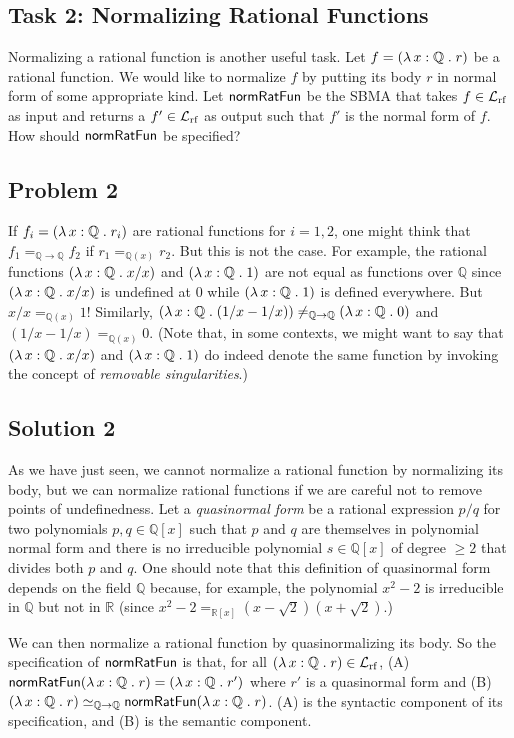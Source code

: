 \documentclass[fleqn]{llncs}
\newcommand{\QQ}{\ensuremath{\mathbb{Q}}}
\newcommand{\RR}{\ensuremath{\mathbb{R}}}
\newcommand{\NRF}{\ensuremath{\mname{normRatFun}}}
\newcommand{\funQ}[1]{\ensuremath{\LambdaApp x : \QQ \mdot #1}}
\newcommand{\Langrf}{\ensuremath{\mathcal{L}}_{\rm rf}}
\begin{document}
\subsection{Task 2: Normalizing Rational Functions}

Normalizing a rational function is another useful task.  Let $f =
(\funQ{r})$ be a rational function.  We would like to normalize $f$ by
putting its body $r$ in normal form of some appropriate kind.  Let
$\NRF$ be the SBMA that takes $f \in \Langrf$ as input and returns a
$f' \in \Langrf$ as output such that $f'$ is the normal form of $f$.
How should $\NRF$ be specified?

\subsection{Problem 2}

If $f_i = (\funQ{r_i})$ are rational functions for $i=1,2$, one might
think that $f_1 =_{\QQ \rightarrow \QQ} f_2$ if $r_1 =_{\QQ(x)} r_2$.
But this is not the case.  For example, the rational functions
$(\funQ{x/x})$ and $(\funQ{1})$ are not equal as functions over $\QQ$
since $(\funQ{x/x})$ is undefined at 0 while $(\funQ{1})$ is defined
everywhere.  But $x/x =_{\QQ(x)} 1$! Similarly, $(\funQ{(1/x - 1/x)})
\not=_{\QQ \rightarrow \QQ} (\funQ{0})$ and $(1/x - 1/x) =_{\QQ(x)}
0$.  (Note that, in some contexts, we might want to say that
$(\funQ{x/x})$ and $(\funQ{1})$ do indeed denote the same function by
invoking the concept of \emph{removable singularities}.)

\subsection{Solution 2}

As we have just seen, we cannot normalize a rational function by
normalizing its body, but we can normalize rational functions if we
are careful not to remove points of undefinedness.  Let a
\emph{quasinormal form} be a rational expression $p/q$ for two
polynomials $p,q \in \QQ[x]$ such that $p$ and $q$ are themselves in
polynomial normal form and there is no irreducible polynomial $s \in
\QQ[x]$ of degree $\ge 2$ that divides both $p$ and $q$.  One should
note that this definition of quasinormal form depends on the field
$\QQ$ because, for example, the polynomial $x^2 - 2$ is irreducible in
$\QQ$ but not in $\RR$ (since $x^2 - 2 =_{\RR[x]} (x - \sqrt{2})(x +
\sqrt{2})$.)

\bsp We can then normalize a rational function by quasinormalizing its
body.  So the specification of $\NRF$ is that, for all $(\funQ{r}) \in
\Langrf$, (A)~$\NRF(\funQ{r}) = (\funQ{r'})$ where $r'$ is a
quasinormal form and (B)~$(\funQ{r}) \simeq_{\QQ \rightarrow \QQ}
\NRF(\funQ{r})$.  (A) is the syntactic component of its specification,
and (B) is the semantic component.\esp
\end{document}
